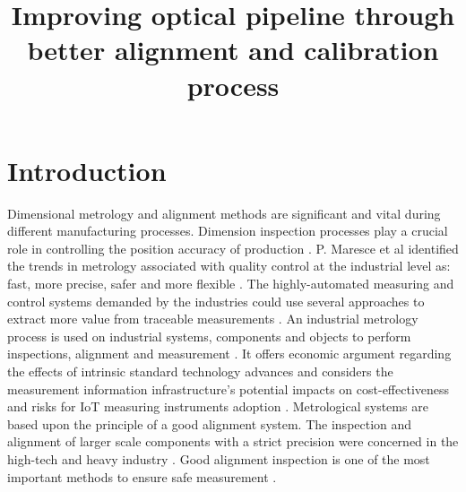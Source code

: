 \documentclass[10pt, a4paper, onecolumn]{article}
\begin{document}
	\title{Improving optical pipeline through better alignment and calibration process}
	
\maketitle

\section{Introduction}
\label{intro}
Dimensional metrology and alignment methods are significant and vital during different manufacturing processes. Dimension inspection processes play a crucial role in controlling the position accuracy of production \cite{gu2020study}. P. Maresce et al identified the trends in metrology associated with quality control at the industrial level as: fast, more precise, safer and more flexible \cite{maresca2019evaluation}. The highly-automated
	measuring and control systems demanded by the industries could use several approaches to extract more value from traceable measurements \cite{hall2019opportunity}. An industrial metrology process is used on industrial systems, components and objects to perform inspections, alignment and measurement \cite{moru2020machine}. It offers economic argument regarding the effects of intrinsic standard technology advances and considers the measurement information infrastructure's potential impacts on cost-effectiveness and risks for IoT measuring instruments adoption \cite{kuster2020measurement}. Metrological systems are based upon the principle of a good alignment system. The inspection and alignment of larger scale components with a strict precision were concerned in the high-tech and heavy industry \cite{gu2020study}. Good alignment inspection is one of the most important methods to ensure safe measurement \cite{peng2020inertial}.
	\newpage
	
	
\end{document}
